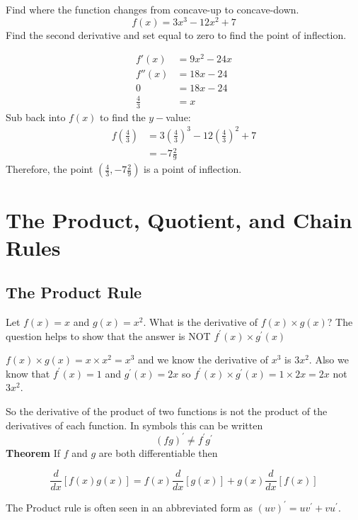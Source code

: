 \example Find where the function changes from concave-up to concave-down.\\
\[f(x)=3x^3-12x^2+7\]
\solution Find the second derivative and set equal to zero to find the point of inflection.
\begin{multicols}{2}
\begin{align*}
f'(x)&=9x^2-24x\\
f''(x)&=18x-24\\
0&=18x-24\\
\frac{4}{3}&=x
\end{align*}
Sub back into $f(x)$ to find the $y-$value:\\
\begin{align*}
f\left(\frac{4}{3}\right)&=3\left(\frac{4}{3}\right)^3-12\left(\frac{4}{3}\right)^2+7\\
&=-7\tfrac{2}{9}
\end{align*}
Therefore, the point $\left(\tfrac{4}{3},-7\frac{2}{9}\right)$ is a point of inflection.
\end{multicols}

\section{The Product, Quotient, and Chain Rules}\label{sec:chainRule}

\subsection*{The Product Rule}
Let $f (x) =x$ and $g (x) =x^{2}$. What is the derivative of $f (x) \times g (x)$? The question helps to show that the answer is NOT $f^{ \prime } (x) \times g^{ \prime } (x)$ 

$f (x) \times g (x) =x \times x^{2} =x^{3}$ and we know the derivative of $x^{3}$ is $3 x^{2}$. Also we know that $f^{ \prime } (x) =1$ and $g^{ \prime } (x) =2 x$ so $f^{ \prime } (x) \times g^{ \prime } (x) =1 \times 2 x =2 x$ not $3 x^{2}$. 

So the derivative of the product of two functions is not the product of the derivatives of each function. In symbols this can be written 
\[\left (f g\right )^{ \prime } \neq f^{ \prime } g^{ \prime }\]
\textbf{Theorem} If $f$ and $g$ are both differentiable then 
\begin{tcolorbox}
	\[\frac{d}{d x} \left [f (x) g (x)\right ] =f (x) \frac{d}{d x} \left [g (x)\right ] +g (x) \frac{d}{d x} \left [f (x)\right ]\]
	\end{tcolorbox}
The Product rule is often seen in an abbreviated form as $\displaystyle \left(u v\right)^{\prime} =uv^{\prime} +vu^{\prime}$.


